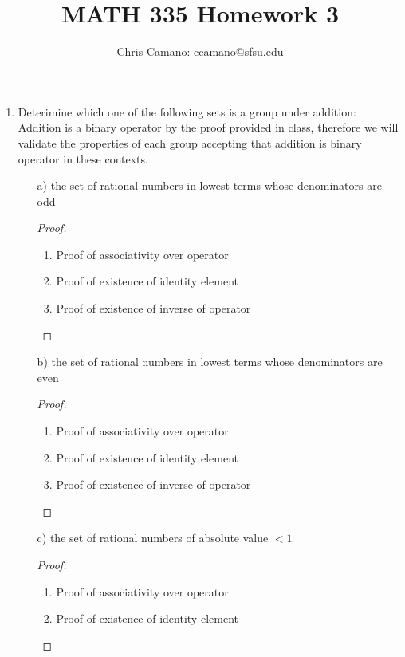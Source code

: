 \documentclass[11pt]{article}
\author{Chris Camano: ccamano@sfsu.edu}
\title{MATH 335  Homework 3 }
\date
\theoremstyle{definition}  %
\begin{document}
\maketitle

\begin{enumerate}
\item Deterimine which one of the following sets is a group under addition:
Addition is a binary operator by the proof provided in class, therefore we will validate the properties of each group accepting that addition is binary operator in these contexts.
  \begin{itemize}
    \item[a)] the set of rational numbers in lowest terms whose denominators are odd
    \begin{proof}
      \begin{enumerate}
        \\
        \item Proof of associativity over operator
        \item Proof of existence of identity element
        \item  Proof of existence of inverse of operator
      \end{enumerate}
    \end{proof}
    \item[b)] the set of rational numbers in lowest terms whose denominators are even
    \begin{proof}\\
      \begin{enumerate}
        \item Proof of associativity over operator
        \item Proof of existence of identity element
        \item  Proof of existence of inverse of operator
      \end{enumerate}
    \end{proof}
    \item[c)] the set of rational numbers of absolute value $<1$
    \begin{proof}\\
      \begin{enumerate}
        \item Proof of associativity over operator
        \item Proof of existence of identity element

\end{enumerate}
\end{proof}
\end{itemize}
\end{enumerate}
\end{document}
